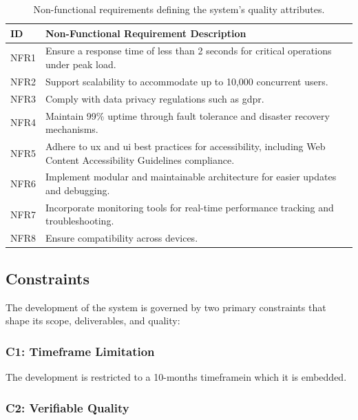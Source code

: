 \begin{table}[!htb]
\centering
\begin{tabular}{|p{}|p{}|}
\hline
\textbf{ID} & \textbf{Non-Functional Requirement Description} \\ \hline
NFR1 & Ensure a response time of less than 2 seconds for critical operations under peak load. \\ \hline
NFR2 & Support scalability to accommodate up to 10,000 concurrent users. \\ \hline
NFR3 & Comply with data privacy regulations such as \ac{gdpr}. \\ \hline
NFR4 & Maintain 99\% uptime through fault tolerance and disaster recovery mechanisms. \\ \hline
NFR5 & Adhere to \ac{ux} and \ac{ui} best practices for accessibility, including Web Content Accessibility Guidelines compliance. \\ \hline
NFR6 & Implement modular and maintainable architecture for easier updates and debugging. \\ \hline
NFR7 & Incorporate monitoring tools for real-time performance tracking and troubleshooting. \\ \hline
NFR8 & Ensure compatibility across devices. \\ \hline
\end{tabular}
\caption[Non-Functional Requirements]{Non-functional requirements defining the system's quality attributes.}
\label{tab:nonfunctional_requirements}
\end{table}


\subsection{Constraints} \label{section:constraints}

The development of the system is governed by two primary constraints that shape its scope, deliverables, and quality:

\subsubsection{C1: Timeframe Limitation}

The development is restricted to a 10-months timeframein which it is embedded.

\subsubsection{C2: Verifiable Quality}

